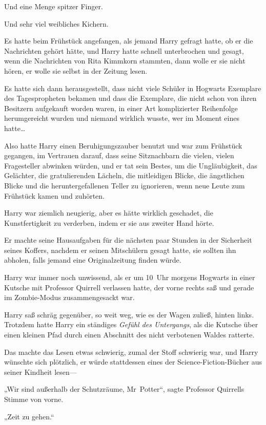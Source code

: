{Und eine Menge spitzer Finger.

Und sehr viel weibliches Kichern.

Es hatte beim Frühstück angefangen, als jemand Harry gefragt hatte, ob er die Nachrichten gehört hätte, und Harry hatte schnell unterbrochen und gesagt, wenn die Nachrichten von Rita Kimmkorn stammten, dann wolle er sie nicht hören, er wolle sie selbst in der Zeitung lesen.

Es hatte sich dann herausgestellt, dass nicht viele Schüler in Hogwarts Exemplare des Tagespropheten bekamen und dass die Exemplare, die nicht schon von ihren Besitzern aufgekauft worden waren, in einer Art komplizierter Reihenfolge herumgereicht wurden und niemand wirklich wusste, wer im Moment eines hatte…

Also hatte Harry einen Beruhigungszauber benutzt und war zum Frühstück gegangen, im Vertrauen darauf, dass seine Sitznachbarn die vielen, vielen Fragesteller abwinken würden, und er tat sein Bestes, um die Ungläubigkeit, das Gelächter, die gratulierenden Lächeln, die mitleidigen Blicke, die ängstlichen Blicke und die heruntergefallenen Teller zu ignorieren, wenn neue Leute zum Frühstück kamen und zuhörten.

Harry war ziemlich neugierig, aber es hätte wirklich geschadet, die Kunstfertigkeit zu verderben, indem er sie aus zweiter Hand hörte.

Er machte seine Hausaufgaben für die nächsten paar Stunden in der Sicherheit seines Koffers, nachdem er seinen Mitschülern gesagt hatte, sie sollten ihn abholen, falls jemand eine Originalzeitung finden würde.

Harry war immer noch unwissend, als er um 10~Uhr morgens Hogwarts in einer Kutsche mit Professor Quirrell verlassen hatte, der vorne rechts saß und gerade im Zombie-Modus zusammengesackt war.

Harry saß schräg gegenüber, so weit weg, wie es der Wagen zuließ, hinten links. Trotzdem hatte Harry ein ständiges \emph{Gefühl des Untergangs}, als die Kutsche über einen kleinen Pfad durch einen Abschnitt des nicht verbotenen Waldes ratterte.

Das machte das Lesen etwas schwierig, zumal der Stoff schwierig war, und Harry wünschte sich plötzlich, er würde stattdessen eines der Science-Fiction-Bücher aus seiner Kindheit lesen—

„Wir sind außerhalb der Schutzräume, Mr~Potter“, sagte Professor Quirrells Stimme von vorne.

„Zeit zu gehen.“

}
